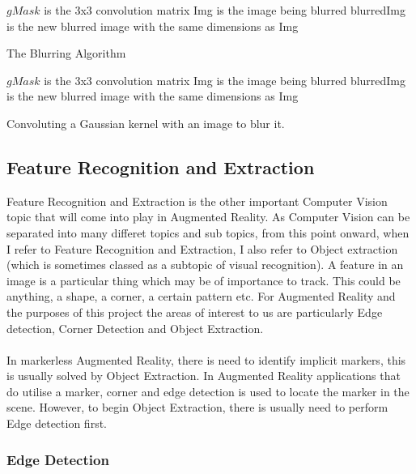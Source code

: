 \documentclass[11pt]{article}
\begin{document}
\begin{algorithm}
\DontPrintSemicolon
$gMask$ is the 3x3 convolution matrix\;
Img is the image being blurred\;
blurredImg is the new blurred image with the same dimensions as Img\;
\caption{The Blurring Algorithm}
\label{algo:blur}
\end{algorithm}

\begin{algorithm}
\DontPrintSemicolon
$gMask$ is the 3x3 convolution matrix\;
Img is the image being blurred\;
blurredImg is the new blurred image with the same dimensions as Img\;
\caption{Convoluting a Gaussian kernel with an image to blur it.}
\label{algo:gaussianblur}
\end{algorithm}

\subsection{Feature Recognition and Extraction}
Feature Recognition and Extraction is the other important Computer Vision
topic that will come into play in Augmented Reality. As Computer Vision can
be separated into many differet topics and sub topics, from this point
onward, when I refer to Feature Recognition and Extraction, I also refer
to Object extraction (which is sometimes classed as a subtopic of
visual recognition). A feature in an image is a particular thing which
may be of importance to track. This could be anything, a shape, a corner,
a certain pattern etc. For Augmented Reality and the purposes of this project
the areas of interest to us are particularly Edge detection, 
Corner Detection and Object Extraction.\\
\\
In markerless Augmented Reality, there is need to identify implicit
markers, this is usually solved by Object Extraction. In Augmented Reality
applications that do utilise a marker, corner and edge detection is used
to locate the marker in the scene. However, to begin Object Extraction, 
there is usually need to perform Edge detection first.

\subsubsection{Edge Detection}
\end{document}
